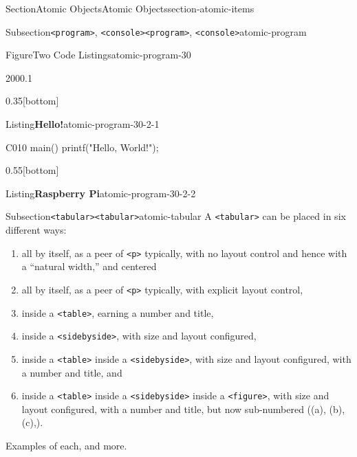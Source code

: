 \documentclass[twoside,10pt,]{article}
\newcommand{\mono}[1]{\texttt{#1}}
\numberwithin{equation}{section}
\newcommand{\consoleinput}[1]{\textbf{#1}}
\begin{document}
\begin{sectionptx}{Section}{Atomic Objects}{}{Atomic Objects}{}{}{section-atomic-items}
\begin{subsectionptx}{Subsection}{\mono{<program>}, \mono{<console>}}{}{\mono{<program>}, \mono{<console>}}{}{}{atomic-program}
\begin{figureptx}{Figure}{Two Code Listings}{atomic-program-30}{}
\begin{sidebyside}{2}{0}{0}{0.1}
\begin{sbspanel}{0.35}[bottom]
\begin{sublistingptx}{Listing}{\textbf{Hello!}}{atomic-program-30-2-1}{}
\begin{program}{C}{0}{1}{0}
main()
{
    printf("Hello, World!");
}
\end{program}
\tcblower
\end{sublistingptx}%
\end{sbspanel}%
\begin{sbspanel}{0.55}[bottom]%
\begin{sublistingptx}{Listing}{\textbf{Raspberry Pi}}{atomic-program-30-2-2}{}%
\tcblower
\end{sublistingptx}%
\end{sbspanel}%
\end{sidebyside}%
\tcblower
\end{figureptx}%
\end{subsectionptx}
%
%
\typeout{************************************************}
\typeout{Subsection 30.4 \mono{<tabular>}}
\typeout{************************************************}
%
\begin{subsectionptx}{Subsection}{\mono{<tabular>}}{}{\mono{<tabular>}}{}{}{atomic-tabular}
A \mono{<tabular>} can be placed in six different ways:%
\begin{enumerate}
\item{}all by itself, as a peer of \mono{<p>} typically, with no layout control and hence with a ``natural width,'' and centered%
\item{}all by itself, as a peer of \mono{<p>} typically, with explicit layout control,%
\item{}inside a \mono{<table>}, earning a number and title,%
\item{}inside a \mono{<sidebyside>}, with size and layout configured,%
\item{}inside a \mono{<table>} inside a \mono{<sidebyside>}, with size and layout configured, with a number and title, and%
\item{}inside a \mono{<table>} inside a \mono{<sidebyside>} inside a \mono{<figure>}, with size and layout configured, with a number and title, but now sub-numbered ((a), (b), (c),\textellipsis{}).%
\end{enumerate}
Examples of each, and more.%
\par

\end{subsectionptx}
\end{sectionptx}
\end{document}
